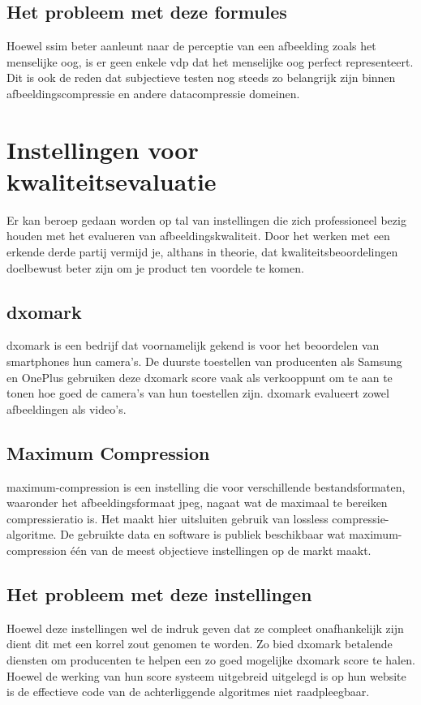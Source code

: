 \subsection{Het probleem met deze formules}
\label{sec:kwaliteit-tools-probleem}

Hoewel \gls{ssim} beter aanleunt naar de perceptie van een afbeelding zoals het menselijke oog, is er geen enkele \gls{vdp} dat het menselijke oog perfect representeert. Dit is ook de reden dat subjectieve testen nog steeds zo belangrijk zijn binnen \gls{afbeeldingscompressie} en andere \gls{datacompressie} domeinen.

\section{Instellingen voor kwaliteitsevaluatie}
\label{sec:kwaliteit-bedrijven}

Er kan beroep gedaan worden op tal van instellingen die zich professioneel bezig houden met het evalueren van afbeeldingskwaliteit. Door het werken met een erkende derde partij vermijd je, althans in theorie, dat kwaliteitsbeoordelingen doelbewust beter zijn om je product ten voordele te komen.

\subsection{dxomark}
\label{sec:kwaliteit-dxomark}

\Gls{dxomark} is een bedrijf dat voornamelijk gekend is voor het beoordelen van smartphones hun camera's. De duurste toestellen van producenten als Samsung en OnePlus gebruiken deze \gls{dxomark} score vaak als verkooppunt om te aan te tonen hoe goed de camera's van hun toestellen zijn. \Gls{dxomark} evalueert zowel afbeeldingen als video's.

\subsection{Maximum Compression}
\label{sec:kwaliteit-maximum-compression}

\Gls{maximum-compression} is een instelling die voor verschillende bestandsformaten, waaronder het \gls{afbeeldingsformaat} \gls{jpeg}, nagaat wat de maximaal te bereiken \gls{compressieratio} is. Het maakt hier uitsluiten gebruik van \gls{lossless} \gls{compressie-algoritme}. De gebruikte data en software is publiek beschikbaar wat \Gls{maximum-compression} één van de meest objectieve instellingen op de markt maakt. 

\subsection{Het probleem met deze instellingen}
\label{sec:kwaliteit-instellingen-probleem}

Hoewel deze instellingen wel de indruk geven dat ze compleet onafhankelijk zijn dient dit met een korrel zout genomen te worden. Zo bied \gls{dxomark} betalende diensten om producenten te helpen een zo goed mogelijke \gls{dxomark} score te halen. Hoewel de werking van hun score systeem uitgebreid uitgelegd is op hun website is de effectieve code van de achterliggende algoritmes niet raadpleegbaar.

